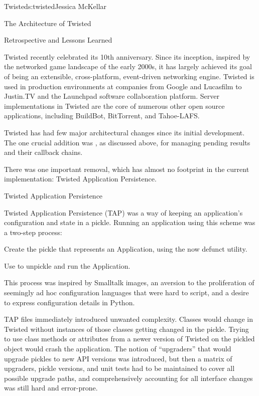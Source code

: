 \begin{aosachapter}{Twisted}{s:twisted}{Jessica McKellar}
\begin{aosasect1}{The Architecture of Twisted}
\end{aosasect1}

\begin{aosasect1}{Retrospective and Lessons Learned}

Twisted recently celebrated its 10th anniversary. Since its inception,
inspired by the networked game landscape of the early 2000s, it has largely
achieved its goal of being an extensible, cross-platform, event-driven
networking engine. Twisted is used in production environments at companies from
Google and Lucasfilm to Justin.TV and the Launchpad software collaboration
platform. Server implementations in Twisted are the core of numerous other open
source applications, including BuildBot, BitTorrent, and Tahoe-LAFS.

Twisted has had few major architectural changes since its initial
development. The one crucial addition was , as
discussed above, for managing pending results and their callback chains.

There was one important removal, which has almost no footprint in the current
implementation: Twisted Application Persistence.

\begin{aosasect2}{Twisted Application Persistence}

Twisted Application Persistence (TAP) was a way of keeping an application's
configuration and state in a pickle. Running an application using this scheme
was a two-step process:

\begin{aosaenumerate}

\item Create the pickle that represents an Application, using the now
  defunct  utility.

\item Use  to unpickle and run the Application.

\end{aosaenumerate}

This process was inspired by Smalltalk images, an aversion to the
proliferation of seemingly ad hoc configuration languages that were hard to
script, and a desire to express configuration details in Python.

TAP files immediately introduced unwanted complexity. Classes would change in
Twisted without instances of those classes getting changed in the pickle. Trying
to use class methods or attributes from a newer version of Twisted on the
pickled object would crash the application. The notion of ``upgraders'' that would
upgrade pickles to new API versions was introduced, but then a matrix of
upgraders, pickle versions, and unit tests had to be maintained to cover all
possible upgrade paths, and comprehensively accounting for all interface changes
was still hard and error-prone.


\end{aosasect2}
\end{aosasect1}
\end{aosachapter}
